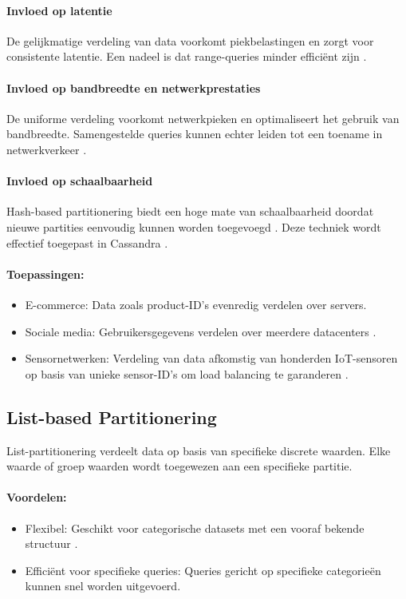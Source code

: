 \paragraph{Invloed op latentie} 
De gelijkmatige verdeling van data voorkomt piekbelastingen en zorgt voor consistente latentie. Een nadeel is dat range-queries minder efficiënt zijn \autocite{Kleppmann2017}.

\paragraph{Invloed op bandbreedte en netwerkprestaties} 
De uniforme verdeling voorkomt netwerkpieken en optimaliseert het gebruik van bandbreedte. Samengestelde queries kunnen echter leiden tot een toename in netwerkverkeer \autocite{Ponnusamy2024}.

\paragraph{Invloed op schaalbaarheid} 
Hash-based partitionering biedt een hoge mate van schaalbaarheid doordat nieuwe partities eenvoudig kunnen worden toegevoegd \autocite{Mahmud2020}. Deze techniek wordt effectief toegepast in Cassandra \autocite{CassandraDocumentation}.

\paragraph{Toepassingen:}
\begin{itemize}
    \item E-commerce: Data zoals product-ID's evenredig verdelen over servers.
    \item Sociale media: Gebruikersgegevens verdelen over meerdere datacenters \autocite{Mahmud2020}.
    \item Sensornetwerken: Verdeling van data afkomstig van honderden IoT-sensoren op basis van unieke sensor-ID's om load balancing te garanderen \autocite{Shi2016}.
\end{itemize}
 
\subsection{List-based Partitionering}
List-partitionering verdeelt data op basis van specifieke discrete waarden. Elke waarde of groep waarden wordt toegewezen aan een specifieke partitie.
 
\paragraph{Voordelen:}
\begin{itemize}
    \item Flexibel: Geschikt voor categorische datasets met een vooraf bekende structuur \autocite{Mahmud2020}.
    \item Efficiënt voor specifieke queries: Queries gericht op specifieke categorieën kunnen snel worden uitgevoerd.
\end{itemize}
 
